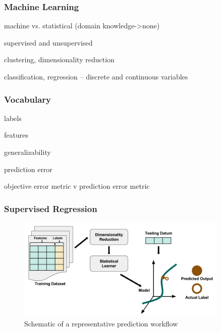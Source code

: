 \begin{frame}
  \frametitle{Machine Learning}
  machine vs. statistical (domain knowledge->none)
  
  supervised and unsupervised
  
  clustering, dimensionality reduction

  classification, regression -- discrete and continuous variables
\end{frame}

\begin{frame}
  \frametitle{Vocabulary}
  labels
  
  features
  
  generalizability
  
  prediction error

  objective error metric v prediction error metric
\end{frame}

\begin{frame}
  \frametitle{Supervised Regression}
  \begin{figure}[h!]
    \centering
    \includegraphics[width=0.9\textwidth]{./figures/SupervisedRegression.png}
    \caption{Schematic of a representative prediction workflow}
  \end{figure}
\end{frame}

